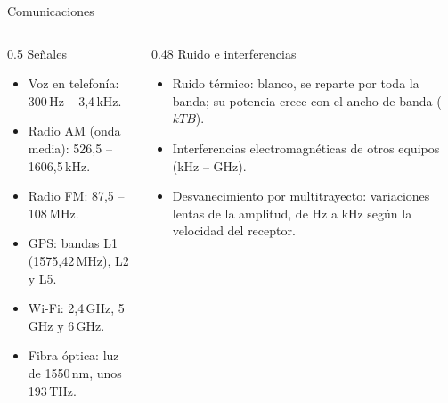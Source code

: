 \documentclass[aspectratio=169,11pt]{beamer}
\begin{document}
\begin{frame}{Comunicaciones}
  \begin{columns}[T]
    \begin{column}{0.5\textwidth}
      \alert{Señales}
      \begin{itemize}\small
        \item Voz en telefonía: 300\,Hz – 3,4\,kHz.
        \item Radio AM (onda media): 526,5 – 1606,5\,kHz.
        \item Radio FM: 87,5 – 108\,MHz.
        \item GPS: bandas L1 (1575,42\,MHz), L2 y L5.
        \item Wi-Fi: 2,4\,GHz, 5\,GHz y 6\,GHz.
        \item Fibra óptica: luz de 1550\,nm, unos 193\,THz.
      \end{itemize}
    \end{column}
    \begin{column}{0.48\textwidth}
      \alert{Ruido e interferencias}
      \begin{itemize}\small
        \item \alert{Ruido térmico}: blanco, se reparte por toda la banda; su potencia crece con el ancho de banda ($kTB$).
        \item Interferencias electromagnéticas de otros equipos (kHz – GHz).
        \item Desvanecimiento por multitrayecto: variaciones lentas de la amplitud, de Hz a kHz según la velocidad del receptor.
      \end{itemize}
    \end{column}
  \end{columns}
\end{frame}
\end{document}
